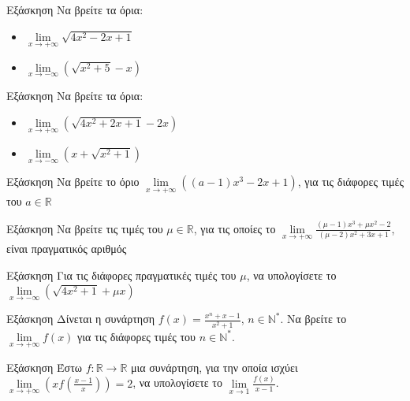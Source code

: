 \documentclass[greek]{beamer}
\begin{document}
\begin{frame}{Εξάσκηση}
      Να βρείτε τα όρια:
      \begin{itemize}
            \item $\lim\limits_{x \to +\infty}{ \sqrt{4x^2-2x+1} }$ \pause
            \item $\lim\limits_{x \to -\infty}{ \left( \sqrt{x^2+5} -x \right)  }$
      \end{itemize}
\end{frame}

\begin{frame}{Εξάσκηση}
      Να βρείτε τα όρια:
      \begin{itemize}
            \item $\lim\limits_{x \to +\infty}{ \left( \sqrt{4x^2+2x+1}-2x \right)  }$ \pause
            \item $\lim\limits_{x \to -\infty}{ \left( x+ \sqrt{x^2+1} \right)  }$
      \end{itemize}
\end{frame}

\begin{frame}{Εξάσκηση}
      Να βρείτε το όριο $\lim\limits_{x \to +\infty}{ \left( (a-1)x^3-2x+1 \right)  }$, για τις διάφορες τιμές του $a\in\mathbb{R}$
\end{frame}

\begin{frame}{Εξάσκηση}
      Να βρείτε τις τιμές του $μ\in\mathbb{R}$, για τις οποίες το $\lim\limits_{x \to +\infty}{ \frac{(μ-1)x^3+μx^2-2}{(μ-2)x^2+3x+1}  }$, είναι πραγματικός αριθμός
\end{frame}

\begin{frame}{Εξάσκηση}
      Για τις διάφορες πραγματικές τιμές του $μ$, να υπολογίσετε το $\lim\limits_{x \to -\infty}{ \left( \sqrt{4x^2+1}+μx \right)  }$
\end{frame}

\begin{frame}{Εξάσκηση}
      Δίνεται η συνάρτηση $f(x)=\frac{x^n+x-1}{x^2+1}$, $n\in\mathbb{N}^*$. Να βρείτε το $\lim\limits_{x \to +\infty}{ f(x) } $ για τις διάφορες τιμές του $n\in\mathbb{N}^*$.
\end{frame}

\begin{frame}{Εξάσκηση}
      Έστω $f:\mathbb{R}\to\mathbb{R}$ μια συνάρτηση, για την οποία ισχύει $\lim\limits_{x \to +\infty}{ \left( xf\left( \frac{x-1}{x} \right)  \right)  }=2$, να υπολογίσετε το $\lim\limits_{x \to 1}{ \frac{f(x)}{x-1} }$.
\end{frame}
\end{document}
